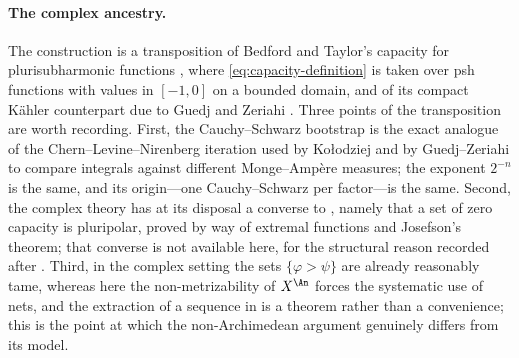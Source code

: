 \paragraph{The complex ancestry.}  The construction is a transposition of
Bedford and Taylor's capacity for plurisubharmonic functions \cite{BT82},
where \eqref{eq:capacity-definition} is taken over psh functions with values
in $[-1,0]$ on a bounded domain, and of its compact K\"ahler counterpart
due to Guedj and Zeriahi \cite{GZ05}.  Three points of the transposition are
worth recording.  First, the Cauchy--Schwarz bootstrap
 is the exact analogue of the
Chern--Levine--Nirenberg iteration used by Ko\l odziej \cite{Kol98} and by
Guedj--Zeriahi \cite{GZ05,GZ07} to compare integrals against different
Monge--Amp\`ere measures; the exponent $2^{-n}$ is the same, and its
origin---one Cauchy--Schwarz per factor---is the same.  Second, the complex
theory has at its disposal a converse to
, namely that a set of zero capacity is
pluripolar, proved by way of extremal functions and Josefson's theorem; that
converse is not available here, for the structural reason recorded after
.  Third, in the complex setting the sets
$\{\varphi>\psi\}$ are already reasonably tame, whereas here the
non-metrizability of $X^{\An}$ forces the systematic use of nets, and the
extraction of a sequence in
 is a theorem rather than a convenience;
this is the point at which the non-Archimedean argument genuinely differs
from its model.

